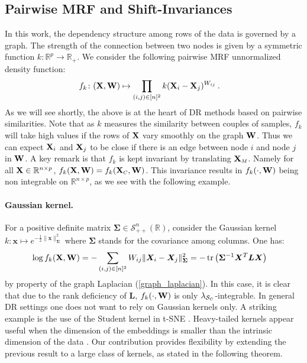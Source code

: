 \subsection{Pairwise MRF and Shift-Invariances}\label{sec:within_CC}

In this work, the dependency structure among rows of the data is governed by a graph. The strength of the connection between two nodes is given by a symmetric function $k : \mathbb{R}^p \to \mathbb{R}_+$. We consider the following pairwise MRF unnormalized density function:
\begin{align}\label{eq:unnormalized_MRF}
  f_{k} \colon (\mathbf{X},\mathbf{W}) &\mapsto \prod_{(i,j) \in [n]^2} k(\mathbf{X}_{i} - \mathbf{X}_{j})^{W_{ij}} \: .
\end{align}
As we will see shortly, the above is at the heart of DR methods based on pairwise similarities. Note that as $k$ measures the similarity between couples of samples, $f_k$ will take high values if the rows of $\mathbf{X}$ vary smoothly on the graph $\mathbf{W}$. Thus we can expect $\mathbf{X}_i$ and $\mathbf{X}_j$ to be close if there is an edge between node $i$ and node $j$ in $\mathbf{W}$. A key remark is that $f_{k}$ is kept invariant by translating $\X_{\scaleto{M}{4pt}}$. Namely for all $\mathbf{X} \in \mathbb{R}^{n \times p}$, $f_{k}(\X, \W) = f_{k}(\X_{\scaleto{C}{4pt}}, \W)$. This invariance results in $f_{k}(\cdot, \mathbf{W})$ being non integrable on $\mathbb{R}^{n \times p}$, as we see with the following example. 

\paragraph{Gaussian kernel.} For a positive definite matrix $\bm{\Sigma} \in \mathcal{S}^n_{++}(\mathbb{R})$, consider the Gaussian kernel $k : \bm{x} \mapsto e^{- \frac{1}{2}\| \bm{x} \|_{\bm{\Sigma}}^2}$ where $\bm{\Sigma}$ stands for the covariance among columns. One has:
\begin{align}\label{eq:gaussian_kernel}
    \log f_{k}(\mathbf{X}, \mathbf{W}) &= -\sum_{(i,j) \in [n]^2} W_{ij} \| \bm{X}_{i}-\bm{X}_{j} \|^2_{\bm{\Sigma}}
    = - \operatorname{tr} \left(\bm{\Sigma}^{-1} \bm{X}^{T} \bm{L} \bm{X}\right)
\end{align}
by property of the graph Laplacian (\cref{graph_laplacian}). In this case, it is clear that due to the rank deficiency of $\bm{L}$, $f_{k}(\cdot, \mathbf{W})$ is only $\lambda_{\mathcal{S}_{\scaleto{C}{3pt}}}$-integrable. In general DR settings one does not want to rely on Gaussian kernels only. A striking example is the use of the Student kernel in t-SNE \cite{maaten2008tSNE}. Heavy-tailed kernels appear useful when the dimension of the embeddings is smaller than the intrinsic dimension of the data \cite{kobak2019heavy}. Our contribution provides flexibility by extending the previous result to a large class of kernels, as stated in the following theorem.

